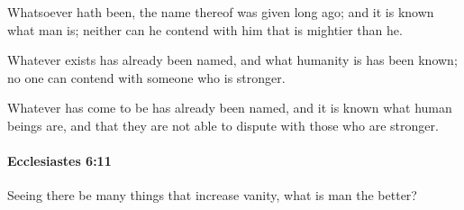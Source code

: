 			\begin{versebox}
					\item[BHS] 
					\item[LXX] 
					\item[ASV] Whatsoever hath been, the name thereof was given long ago; and it is known what man is; neither can he contend with him that is mightier than he.
					\item[NIV] Whatever exists has already been named, and what humanity is has been known; no one can contend with someone who is stronger.
					\item[NRSV] Whatever has come to be has already been named, and it is known what human beings are, and that they are not able to dispute with those who are stronger.
			\end{versebox}

		\paragraph{Ecclesiastes 6:11} %
			\label{ECCLESIASTES-6-11}

			Seeing there be many things that increase vanity, what is man the better?

